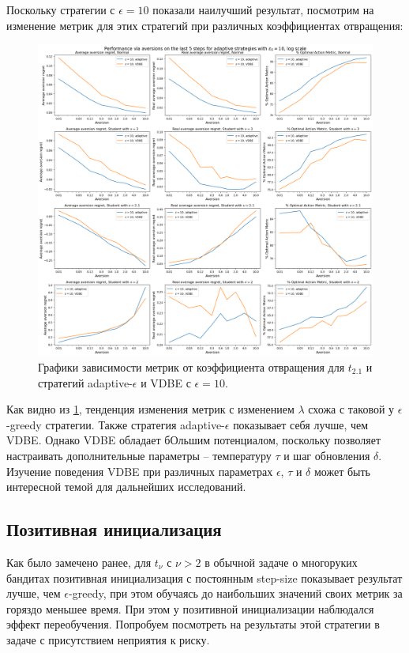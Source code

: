 Поскольку стратегии с $\epsilon=10$ показали наилучший результат, посмотрим на изменение метрик для этих стратегий при различных коэффициентах отвращения:

\begin{figure}[ht!] %
\centering
\includegraphics[width=6in]{theory_tester/theory_images/adaptive_epsilon/aversion_last_5_steps.png}
\caption{Графики зависимости метрик от коэффициента отвращения для $t_{2.1}$ и стратегий adaptive-$\epsilon$ и VDBE с $\epsilon=10$.}
\label{fig:adaptive_eps_last_5_steps}
\end{figure}

Как видно из \ref{fig:adaptive_eps_last_5_steps}, тенденция изменения метрик с изменением $\lambda$ схожа с таковой у $\epsilon$-greedy стратегии. Также стратегия adaptive-$\epsilon$ показывает себя лучше, чем VDBE. Однако VDBE обладает бОльшим потенциалом, поскольку позволяет настраивать дополнительные параметры -- температуру $\tau$ и шаг обновления $\delta$. Изучение поведения VDBE при различных параметрах $\epsilon$, $\tau$ и $\delta$ может быть интересной темой для дальнейших исследований.

\subsection{Позитивная инициализация}

Как было замечено ранее, для $t_{\nu}$ с $\nu > 2$ в обычной задаче о многоруких бандитах позитивная инициализация с постоянным step-size показывает результат лучше, чем $\epsilon$-greedy, при этом обучаясь до наибольших значений своих метрик за горяздо меньшее время. При этом у позитивной инициализации наблюдался эффект переобучения. Попробуем посмотреть на результаты этой стратегии в задаче с присутствием неприятия к риску.

